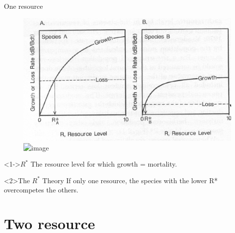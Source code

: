 \documentclass[final,xcolor=dvipsnames]{beamer}
\begin{document}
\begin{frame}{One resource}
\begin{figure}
\includegraphics[width=.5\framewidth]{1ressourceGrowth}
\includegraphics<2>[width=.4\framewidth]{1RessourceCompetition}
\end{figure}
\begin{block}<1->{$R^*$}
The resource level for which growth = mortality.
\end{block}
\begin{block}<2>{The $R^*$ Theory}
If only one resource, the species with the lower R* overcompetes the others. 
\end{block}
\end{frame}

\section{Two resource}
\end{document}

